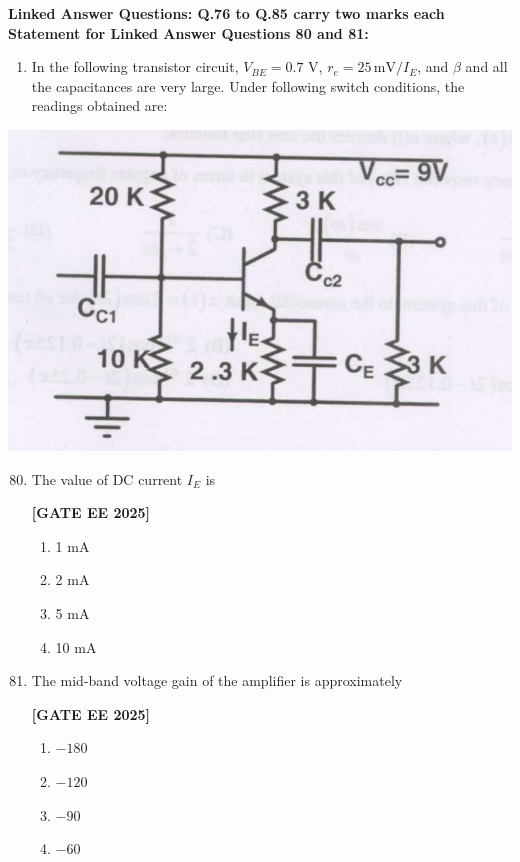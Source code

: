 \documentclass[12pt]{article}
\begin{document}
\vspace{1em}
 \large \textbf {Linked Answer Questions: Q.76 to Q.85 carry two marks each}
 \large \textbf {Statement for Linked Answer Questions 80 and 81: }
\vspace{1em}
\begin{enumerate}
\item In the following transistor circuit, $V_{BE}=0.7$ V, $r_e = 25\,\text{mV}/I_E$, and $\beta$ and all the capacitances are very large. Under following switch conditions, the readings obtained are:
\end{enumerate}
\begin{center}
\includegraphics[width=0.6\columnwidth]{figs/q8081.png}
\end{center}

\begin{enumerate}[leftmargin=*, label=\textbf{Q.\arabic*:}]
\setcounter{enumi}{79}

\item The value of DC current $I_E$ is
 
\noindent \textbf{[GATE EE 2025]}
\begin{enumerate}
  \item 1 mA
  \item 2 mA
  \item 5 mA
  \item 10 mA
\end{enumerate}

\item The mid-band voltage gain of the amplifier is approximately
 
\noindent \textbf{[GATE EE 2025]}
\begin{enumerate}
  \item $-180$
  \item $-120$
  \item $-90$
  \item $-60$
\end{enumerate}

\end{enumerate}
\end{document}
